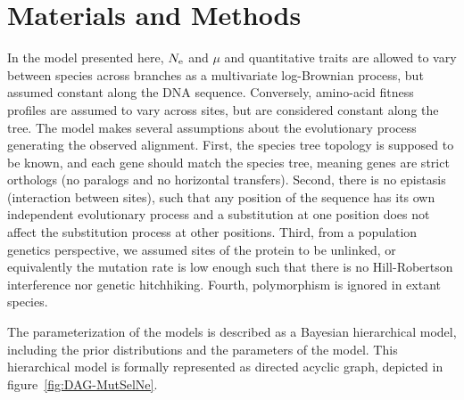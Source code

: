 \documentclass{article}
\begin{document}
    \section{Materials and Methods}
    \label{sec:MatMet}

    In the model presented here, $N_{\text{e}}$ and $\mu$ and quantitative traits are allowed to vary between species across branches as a multivariate log-Brownian process, but assumed constant along the DNA sequence.
    Conversely, amino-acid fitness profiles are assumed to vary across sites, but are considered constant along the tree.
    The model makes several assumptions about the evolutionary process generating the observed alignment.
    First, the species tree topology is supposed to be known, and each gene should match the species tree, meaning genes are strict orthologs (no paralogs and no horizontal transfers).
    Second, there is no epistasis (interaction between sites), such that any position of the sequence has its own independent evolutionary process and a substitution at one position does not affect the substitution process at other positions.
    Third, from a population genetics perspective, we assumed sites of the protein to be unlinked, or equivalently the mutation rate is low enough such that there is no Hill-Robertson interference nor genetic hitchhiking.
    Fourth, polymorphism is ignored in extant species.

    The parameterization of the models is described as a Bayesian hierarchical model, including the prior distributions and the parameters of the model.
    This hierarchical model is formally represented as directed acyclic graph, depicted in figure~\ref{fig:DAG-MutSelNe}.
\end{document}
